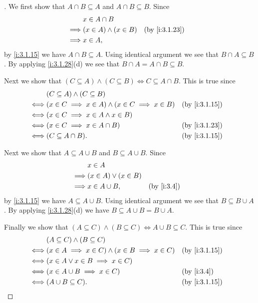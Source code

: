 \begin{proof}[]
  We first show that \(A \cap B \subseteq A\) and \(A \cap B \subseteq B\).
  Since
  \begin{align*}
             & x \in A \cap B                               \\
    \implies & (x \in A) \land (x \in B) &  & \by{i:3.1.23} \\
    \implies & x \in A,
  \end{align*}
  by \cref{i:3.1.15} we have \(A \cap B \subseteq A\).
  Using identical argument we see that \(B \cap A \subseteq B\).
  By applying \cref{i:3.1.28}(d) we see that \(B \cap A = A \cap B \subseteq B\).

  Next we show that \((C \subseteq A) \land (C \subseteq B) \iff C \subseteq A \cap B\).
  This is true since
  \begin{align*}
         & (C \subseteq A) \land (C \subseteq B)                                          \\
    \iff & (x \in C \implies x \in A) \land (x \in C \implies x \in B) &  & \by{i:3.1.15} \\
    \iff & (x \in C \implies x \in A \land x \in B)                                       \\
    \iff & (x \in C \implies x \in A \cap B)                           &  & \by{i:3.1.23} \\
    \iff & (C \subseteq A \cap B).                                     &  & \by{i:3.1.15}
  \end{align*}

  Next we show that \(A \subseteq A \cup B\) and \(B \subseteq A \cup B\).
  Since
  \begin{align*}
             & x \in A                                  \\
    \implies & (x \in A) \lor (x \in B)                 \\
    \implies & x \in A \cup B,          &  & \by{i:3.4}
  \end{align*}
  by \cref{i:3.1.15} we have \(A \subseteq A \cup B\).
  Using identical argument we see that \(B \subseteq B \cup A\).
  By applying \cref{i:3.1.28}(d) we have \(B \subseteq A \cup B = B \cup A\).

  Finally we show that \((A \subseteq C) \land (B \subseteq C) \iff A \cup B \subseteq C\).
  This is true since
  \begin{align*}
         & (A \subseteq C) \land (B \subseteq C)                                          \\
    \iff & (x \in A \implies x \in C) \land (x \in B \implies x \in C) &  & \by{i:3.1.15} \\
    \iff & (x \in A \lor x \in B \implies x \in C)                                        \\
    \iff & (x \in A \cup B \implies x \in C)                           &  & \by{i:3.4}    \\
    \iff & (A \cup B \subseteq C).                                     &  & \by{i:3.1.15}
  \end{align*}
\end{proof}

